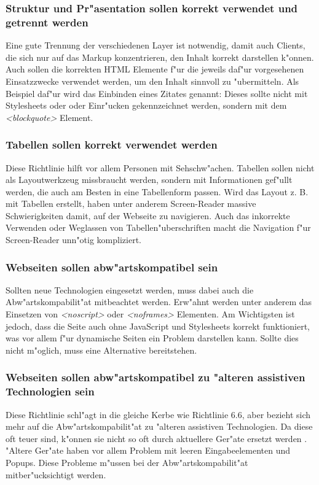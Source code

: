 \documentclass[a4paper,bibtotoc,oneside]{scrbook}
\begin{document}
\subsubsection{Struktur und Pr"asentation sollen korrekt verwendet und getrennt werden}
Eine gute Trennung der verschiedenen Layer ist notwendig, damit auch Clients, die sich nur auf das Markup konzentrieren, den Inhalt korrekt darstellen k"onnen\cite[S. 42-43]{barr_webd}. Auch sollen die korrekten HTML Elemente f"ur die jeweils daf"ur vorgesehenen Einsatzzwecke verwendet werden, um den Inhalt sinnvoll zu "ubermitteln. Als Beispiel daf"ur wird das Einbinden eines Zitates genannt: Dieses sollte nicht mit Stylesheets oder oder Einr"ucken gekennzeichnet werden, sondern mit dem \emph{<blockquote>} Element. \cite[Abschnitt 6.3]{wcag1}

\subsubsection{Tabellen sollen korrekt verwendet werden}
Diese Richtlinie hilft vor allem Personen mit Sehschw"achen. Tabellen sollen nicht als Layoutwerkzeug missbraucht werden, sondern mit Informationen gef"ullt werden, die auch am Besten in eine Tabellenform passen. Wird das Layout z. B. mit Tabellen erstellt, haben unter anderem Screen-Reader massive Schwierigkeiten damit, auf der Webseite zu navigieren. Auch das inkorrekte Verwenden oder Weglassen von Tabellen"uberschriften macht die Navigation f"ur Screen-Reader unn"otig kompliziert. \cite[Abschnitt 6.5]{wcag1}

\subsubsection{Webseiten sollen abw"artskompatibel sein}
Sollten neue Technologien eingesetzt werden, muss dabei auch die Abw"artskompabilit"at mitbeachtet werden. Erw"ahnt werden unter anderem das Einsetzen von \emph{<noscript>} oder \emph{<noframes>} Elementen. Am Wichtigsten ist jedoch, dass die Seite auch ohne JavaScript und Stylesheets korrekt funktioniert, was vor allem f"ur dynamische Seiten ein Problem darstellen kann. Sollte dies nicht m"oglich, muss eine Alternative bereitstehen. \cite[Abschnitt 6.6]{wcag1}

\subsubsection{Webseiten sollen abw"artskompatibel zu "alteren assistiven Technologien sein}
Diese Richtlinie schl"agt in die gleiche Kerbe wie Richtlinie 6.6, aber bezieht sich mehr auf die Abw"artskompabilit"at zu "alteren assistiven Technologien. Da diese oft teuer sind, k"onnen sie nicht so oft durch aktuellere Ger"ate ersetzt werden \cite[S. 48]{barr_webd}. "Altere Ger"ate haben vor allem Problem mit leeren Eingabeelementen und Popups. Diese Probleme m"ussen bei der Abw"artskompabilit"at mitber"ucksichtigt werden. \cite[Abschnitt 6.10]{wcag1}
\end{document}
